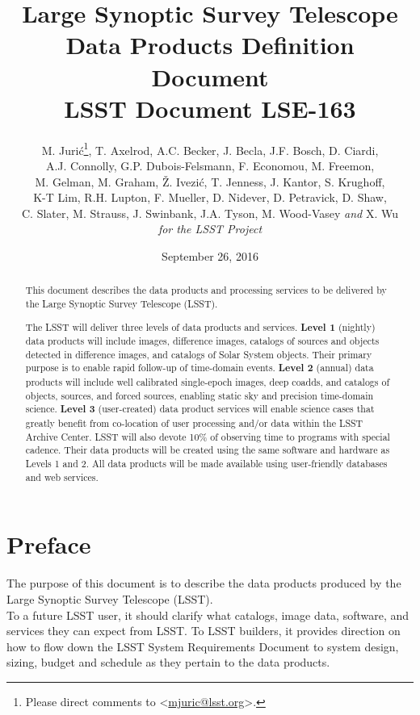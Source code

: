 \documentclass[12pt]{article}
\title{\vskip -1in Large Synoptic Survey Telescope \\
Data Products Definition Document \\
{\small \bf LSST Document LSE-163}}
\author{
{\small M. Juri\'c}\footnote{Please direct comments to \textless\href{mailto:mjuric@lsst.org}{mjuric@lsst.org}\textgreater.},
{\small T. Axelrod, A.C. Becker, J. Becla, J.F. Bosch, D. Ciardi, } \\
{\small A.J. Connolly,  G.P. Dubois-Felsmann, F. Economou, M. Freemon, } \\
{\small M. Gelman, M. Graham, \v{Z}. Ivezi\'c, T. Jenness,  J. Kantor, S. Krughoff, } \\
{\small K-T Lim,  R.H. Lupton, F. Mueller, D. Nidever, D. Petravick, D. Shaw, } \\
{\small C. Slater, M. Strauss, J. Swinbank, J.A. Tyson, M. Wood-Vasey {\em and} X. Wu} \vspace{1.2ex} \\
{\small {\em for the LSST Project}}
}
\begin{document}
\date{September 26, 2016}

\maketitle
\pagestyle{headings}

\begin{abstract}
This document describes the data products and processing services to be delivered by the Large Synoptic Survey Telescope (LSST).

The LSST will deliver three levels of data products and services. {\bf Level 1} (nightly) data products will include images, difference images, catalogs of sources and objects detected in difference images, and catalogs of Solar System objects. Their primary purpose is to enable rapid follow-up of time-domain events. {\bf Level 2} (annual) data products will include well calibrated single-epoch images, deep coadds, and catalogs of objects, sources, and forced sources, enabling static sky and precision time-domain science. {\bf Level 3} (user-created) data product services will enable science cases that greatly benefit from co-location of user processing and/or data within the LSST Archive Center. LSST will also devote 10\% of observing time to programs with special cadence. Their data products will be created using the same software and hardware as Levels 1 and 2. All data products will be made available using user-friendly databases and web services.

\end{abstract}

\clearpage

\tableofcontents

\clearpage

\section{Preface}

The purpose of this document is to describe the data products produced by the Large Synoptic Survey Telescope (LSST).
\\

To a future LSST user, it should clarify what catalogs, image data, software, and services they can expect from LSST. To LSST builders, it provides direction on how to flow down the LSST System Requirements Document to system design, sizing, budget and schedule as they pertain to the data products.
\\
\end{document}
